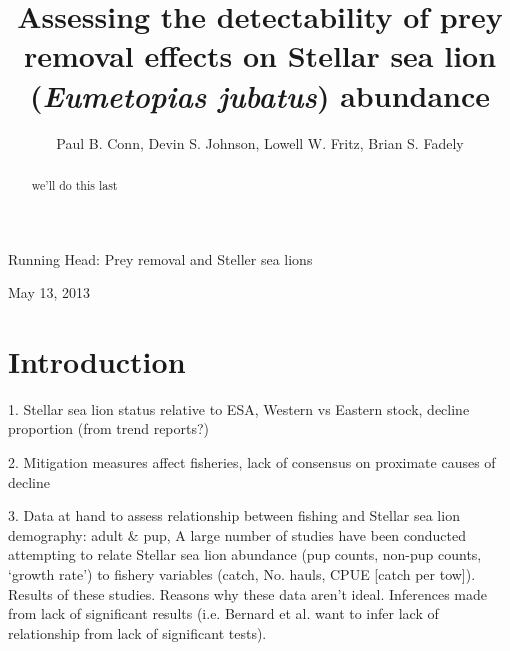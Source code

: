 \documentclass[nonumbib,leqno]{nrc1}
\begin{document}
\title{Assessing the detectability of prey removal effects on Stellar sea lion ({\it Eumetopias jubatus}) abundance}

\author[P. B. Conn, D. S. Johnson, L. W. Fritz, B. S. Fadely]{Paul B. Conn, Devin S. Johnson, Lowell W. Fritz, Brian S. Fadely}
\address{National Marine Mammal Laboratory, Alaska Fisheries Science Center,
NOAA National Marine Fisheries Service,
Seattle, Washington, U.S.A. 98115}

\large

\maketitle

{\sc Running Head}: Prey removal and Steller sea lions \bigskip

May 13, 2013



\clearpage

\linenumbers


\begin{abstract}
\large
we'll do this last
\end{abstract}




\clearpage

\renewcommand{\baselinestretch}{1.8}\normalsize


\section{Introduction}

1. Stellar sea lion status relative to ESA, Western vs Eastern stock, decline proportion (from trend reports?)

2. Mitigation measures affect fisheries, lack of consensus on proximate causes of decline

3. Data at hand to assess relationship between fishing and Stellar sea lion demography: adult \& pup,
A large number of studies have been conducted attempting to relate Stellar sea lion abundance (pup counts, non-pup counts, `growth rate') to fishery variables (catch, No. hauls, CPUE [catch per tow]).  Results of these studies. Reasons why these data aren't ideal.  Inferences made from lack of significant results (i.e. Bernard et al. want to infer lack of relationship from lack of significant tests).
\end{document}
